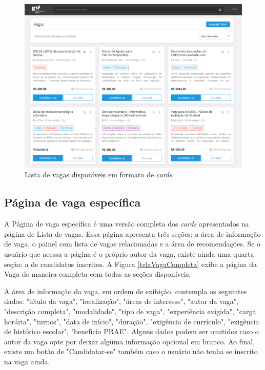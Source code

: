 \begin{figure}[ht]
    \caption{Lista de vagas disponíveis em formato de \textit{cards}.}
       	\begin{center}
            \includegraphics[width=1\textwidth]{figuras/vagas-lista.png}
        \end{center}
    \label{telaVagasLista}
\end{figure}

\subsection{Página de vaga específica}
\label{PDVFunVaga}

A Página de vaga específica é uma versão completa dos \textit{cards} apresentados na página de Lista de vagas. Essa página apresenta três seções: a área de informação de vaga, o painel com lista de vagas relacionadas e a área de recomendações. Se o usuário que acessa a página é o próprio autor da vaga, existe ainda uma quarta seção: a de candidatos inscritos. A Figura \ref{telaVagaCompleta} exibe a página da Vaga de maneira completa com todas as seções disponíveis.

A área de informação da vaga, em ordem de exibição, contempla os seguintes dados: "título da vaga", "localização", "áreas de interesse", "autor da vaga", "descrição completa", "modalidade", "tipo de vaga", "experiência exigida", "carga horária", "turnos", "data de início", "duração", "exigência de currículo", "exigência de histórico escolar", "benefício PRAE". Alguns dados podem ser omitidos caso o autor da vaga opte por deixar alguma informação opcional em branco. Ao final, existe um botão de "Candidatar-se" também caso o usuário não tenha se inscrito na vaga ainda.


